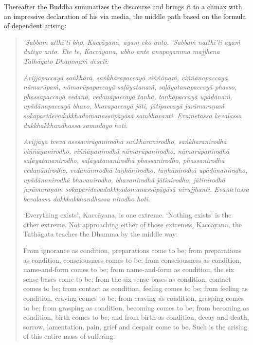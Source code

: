 Thereafter the Buddha summarizes the discourse and brings it to a climax with an impressive declaration of his via media, the middle path based on the formula of dependent arising:

\begin{quote}
\emph{`Sabbam atthī'ti kho, Kaccāyana, ayam eko anto. `Sabbaṁ natthī'ti ayaṁ dutiyo anto. Ete te, Kaccāyana, ubho ante anupagamma majjhena Tathāgato Dhammaṁ deseti:}

\emph{Avijjāpaccayā saṅkhārā, saṅkhārapaccayā viññāṇaṁ, viññāṇapaccayā nāmarūpaṁ, nāmarūpapaccayā saḷāyatanaṁ, saḷāyatanapaccayā phasso, phassapaccayā vedanā, vedanāpaccayā taṇhā, taṇhāpaccayā upādānaṁ, upādānapaccayā bhavo, bhavapaccayā jāti, jātipaccayā jarāmaraṇaṁ sokaparidevadukkhadomanassūpāyāsā sambhavanti. Evametassa kevalassa dukkhakkhandhassa samudayo hoti.}

\emph{Avijjāya tveva asesavirāganirodhā saṅkhāranirodho, saṅkharanirodhā viññāṇanirodho, viññāṇanirodhā nāmarūpanirodho, nāmarūpanirodhā saḷāyatananirodho, saḷāyatananirodhā phassanirodho, phassanirodhā vedanānirodho, vedanānirodhā taṇhānirodho, taṇhānirodhā upādānanirodho, upādānanirodhā bhavanirodho, bhavanirodhā jātinirodho, jātinirodhā jarāmaraṇaṁ sokaparidevadukkhadomanassūpāyāsā nirujjhanti. Evametassa kevalassa dukkhakkhandhassa nirodho hoti}.

`Everything exists', Kaccāyana, is one extreme. `Nothing exists' is the other extreme. Not approaching either of those extremes, Kaccāyana, the Tathāgata teaches the Dhamma by the middle way:

From ignorance as condition, preparations come to be; from preparations as condition, consciousness comes to be; from consciousness as condition, name-and-form comes to be; from name-and-form as condition, the six sense-bases come to be; from the six sense-bases as condition, contact comes to be; from contact as condition, feeling comes to be; from feeling as condition, craving comes to be; from craving as condition, grasping comes to be; from grasping as condition, becoming comes to be; from becoming as condition, birth comes to be; and from birth as condition, decay-and-death, sorrow, lamentation, pain, grief and despair come to be. Such is the arising of this entire mass of suffering.


\end{quote}
